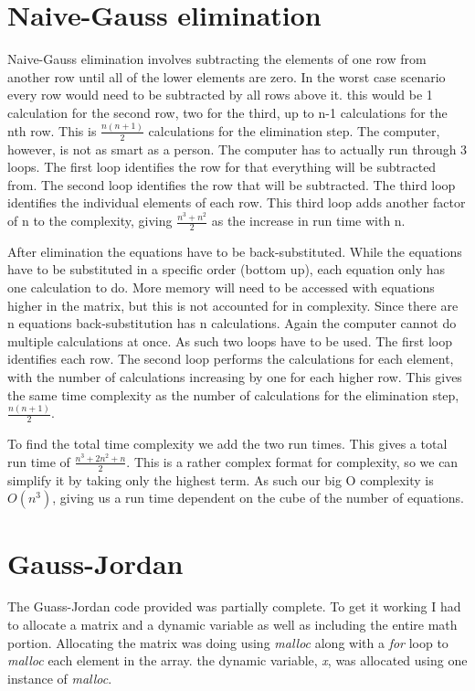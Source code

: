 \documentclass{article}
\begin{document}
\section{Naive-Gauss elimination}
Naive-Gauss elimination involves subtracting the elements of one row from another row until all of the lower elements are zero. In the worst case scenario every row would need to be subtracted by all rows above it. this would be 1 calculation for the second row, two for the third, up to n-1 calculations for the nth row. This is $\frac{n(n+1)}{2}$ calculations for the elimination step. The computer, however, is not as smart as a person. The computer has to actually run through 3 loops. The first loop identifies the row for that everything will be subtracted from. The second loop identifies the row that will be subtracted. The third loop identifies the individual elements of each row. This third loop adds another factor of n to the complexity, giving $\frac{n^3+n^2}{2}$ as the increase in run time with n.

After elimination the equations have to be back-substituted. While the equations have to be substituted in a specific order (bottom up), each equation only has one calculation to do. More memory will need to be accessed with equations higher in the matrix, but this is not accounted for in complexity. Since there are n equations back-substitution has n calculations. Again the computer cannot do multiple calculations at once. As such two loops have to be used. The first loop identifies each row. The second loop performs the calculations for each element, with the number of calculations increasing by one for each higher row. This gives the same time complexity as the number of calculations for the elimination step, $\frac{n(n+1)}{2}$.

To find the total time complexity we add the two run times. This gives a total run time of $\frac{n^3+2n^2+n}{2}$. This is a rather complex format for complexity, so we can simplify it by taking only the highest term. As such our big O complexity is $O(n^3)$, giving us a run time dependent on the cube of the number of equations.

\section{Gauss-Jordan}
The Guass-Jordan code provided was partially complete. To get it working I had to allocate a matrix and a dynamic variable as well as including the entire math portion. Allocating the matrix was doing using \textit{malloc} along with a \textit{for} loop to \textit{malloc} each element in the array. the dynamic variable, \textit{x}, was allocated using one instance of \textit{malloc}.
\end{document}
